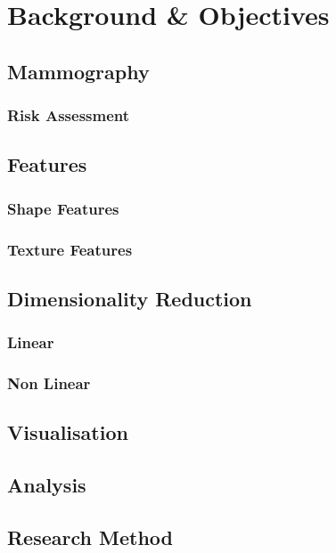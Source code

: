 \chapter{Background \& Objectives}

\section{Mammography}
\subsection{Risk Assessment}

\section{Features}
\subsection{Shape Features}
\subsection{Texture Features}

\section{Dimensionality Reduction}
\subsection{Linear}
\subsection{Non Linear}

\section{Visualisation}

\section{Analysis}

\section{Research Method}
